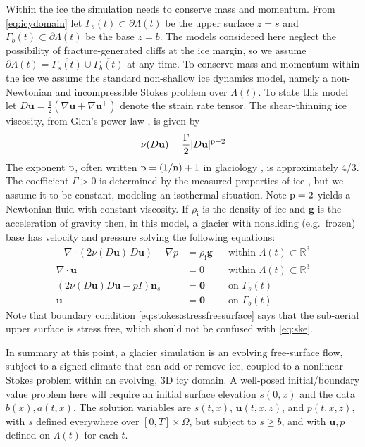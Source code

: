 \documentclass[hidelinks,onefignum,onetabnum,final]{siamart220329}  %
\newcommand{\RR}{\mathbb{R}}
\newcommand{\grad}{\nabla}
\newcommand{\bg}{\mathbf{g}}
\newcommand{\bn}{\mathbf{n}}
\newcommand{\bu}{\mathbf{u}}
\newcommand{\bzero}{\bm{0}}
\newcommand{\nn}{{\text{\textnormal{n}}}}
\newcommand{\pp}{{\text{\textnormal{p}}}}
\newcommand{\rhoi}{\rho_{\text{i}}}
\begin{document}
Within the ice the simulation needs to conserve mass and momentum.  From \eqref{eq:icydomain} let $\Gamma_s(t) \subset \partial \Lambda(t)$ be the upper surface $z=s$ and
$\Gamma_b(t) \subset \partial \Lambda(t)$ be the base $z=b$.  The models considered here neglect the possibility of fracture-generated cliffs at the ice margin, so we assume $\partial \Lambda(t) = \overline{\Gamma_s(t)} \cup \overline{\Gamma_b(t)}$ at any time.  To conserve mass and momentum within the ice we assume the standard non-shallow ice dynamics model, namely a non-Newtonian and incompressible Stokes problem \cite{GreveBlatter2009,JouvetRappaz2011,SchoofHewitt2013} over $\Lambda(t)$.  To state this model let $D\bu=\frac{1}{2}(\grad \bu + \grad \bu^{\top})$ denote the strain rate tensor.  The shear-thinning ice viscosity, from Glen's power law \cite{GreveBlatter2009}, is given by
\begin{equation}
\nu(D\bu) = \frac{\Gamma}{2} |D\bu|^{\pp-2} \label{eq:glen}
\end{equation}
The exponent $\pp$, often written $\pp=(1/\nn)+1$ in glaciology \cite{GoldsbyKohlstedt2001}, is approximately 4/3.  The coefficient $\Gamma>0$ is determined by the measured properties of ice \cite{GoldsbyKohlstedt2001,GreveBlatter2009}, but we assume it to be constant, modeling an isothermal situation.  Note $\pp=2$ yields a Newtonian fluid with constant viscosity.  If $\rhoi$ is the density of ice and $\bg$ is the acceleration of gravity then,  in this model, a glacier with nonsliding (e.g.~frozen) base \cite{JouvetRappaz2011} has velocity and pressure solving the following equations:
\begin{subequations}
\label{eq:stokes}
\begin{align}
- \nabla \cdot \left(2 \nu(D\bu)\, D\bu\right) + \nabla p &= \rhoi \bg && \text{within $\Lambda(t) \subset \RR^3$} \\
\nabla \cdot \bu &= 0 && \text{within $\Lambda(t) \subset \RR^3$} \label{eq:stokes:incomp} \\
\left(2 \nu(D\bu) D\bu - pI\right) \bn_s &= \bzero && \text{on $\Gamma_s(t)$}\label{eq:stokes:stressfreesurface} \\
\bu  &= \bzero && \text{on $\Gamma_b(t)$}
\end{align}
\end{subequations}
Note that boundary condition \eqref{eq:stokes:stressfreesurface} says that the sub-aerial upper surface is stress free, which should not be confused with \eqref{eq:ske}.

In summary at this point, a glacier simulation is an evolving free-surface flow, subject to a signed climate that can add or remove ice, coupled to a nonlinear Stokes problem within an evolving, 3D icy domain.  A well-posed initial/boundary value problem here will require an initial surface elevation $s(0,x)$ and the data $b(x),a(t,x)$.  The solution variables are $s(t,x)$, $\bu(t,x,z)$, and $p(t,x,z)$, with $s$ defined everywhere over $[0,T]\times \Omega$, but subject to $s \ge b$, and with $\bu,p$ defined on $\Lambda(t)$ for each $t$.
\end{document}
